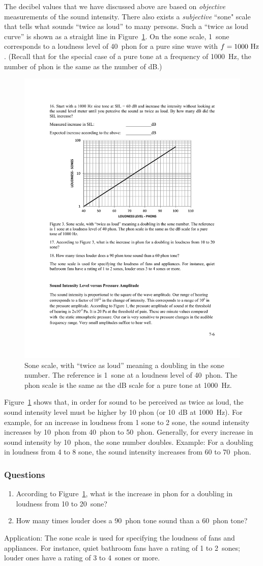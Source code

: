 \documentclass[11pt]{NSF}
\def\ben{\begin{enumerate}}
\def\een{\end{enumerate}}
\begin{document}
The decibel values that we have discussed above are based on 
{\em objective} measurements of the sound intensity. 
There also exists a {\em subjective} ``sone" scale that tells 
what sounds ``twice as loud” to many persons. 
Such a ``twice as loud curve” is shown as a straight line in 
Figure~\ref{f:3}. 
On the sone scale, 1~sone corresponds to a loudness level of 
40~phon for a pure sine wave with $f = 1000~{\rm Hz}$. 
(Recall that for the special case of a pure tone at a frequency 
of 1000~Hz, the number of phon is the same 
as the number of dB.)
%
\begin{figure}[hbtp]
\begin{center}
\includegraphics[width=.6\textwidth]{fig7_3}
\caption{Sone scale, with ``twice as loud” meaning a doubling in the
sone number. The reference is 1~sone at a loudness level of 40~phon.
The phon scale is the same as the dB scale for a pure tone at 1000~Hz.}
\label{f:3}
\end{center}
\end{figure}

Figure~\ref{f:3} shows that, in order for sound to be perceived as twice as
loud, the sound intensity level must be higher by 10 phon (or 10~dB at
1000~Hz).
For example, for an increase in loudness from 1 sone to 2 sone, the 
sound intensity increases by 10~phon from 40~phon to 50~phon. 
Generally, for every increase in sound intensity by 10~phon, the sone 
number doubles. 
Example: For a doubling in loudness from 4 to 8 sone, the sound intensity 
increases from 60 to 70~phon.

\subsubsection*{Questions}
\ben
\item
According to Figure~\ref{f:3}, what is the increase in phon for a 
doubling in loudness from 10 to 20~sone?

\item
How many times louder does a 90~phon tone sound than a 60~phon tone?

\een

Application:
The sone scale is used for specifying the loudness of fans and
appliances. For instance, quiet bathroom fans have a rating of 1 to 
2~sones; louder ones have a rating of 3 to 4~sones or more.
\end{document}
